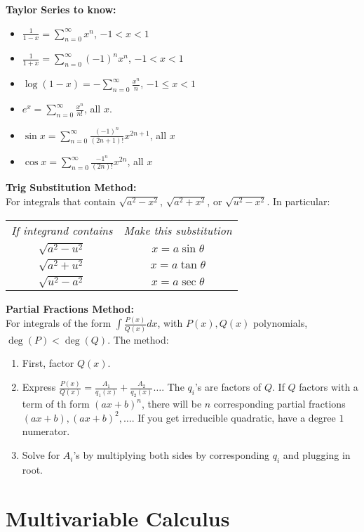 \documentclass[12pt]{amsart}
\begin{document}
\begin{multicols}{2}
\textbf{Taylor Series to know:}
\begin{itemize}
    \item $ \frac{1}{1-x} = \sum^{\infty}_{n=0} x^n$, $-1 < x < 1$
    \item $ \frac{1}{1+x} = \sum^{\infty}_{n=0} {(-1)}^n x^n$, $-1 < x < 1$
    \item $ \log(1-x) = -\sum^{\infty}_{n=0} \frac{x^n}{n}$, $-1 \leq x < 1$
    \item $ e^x = \sum^{\infty}_{n=0} \frac{x^n}{n!} $, all $x$.
    \item $ \sin x = \sum^{\infty}_{n=0} \frac{{(-1)}^n}{(2n+1)!}x^{2n+1}$, all $x$
    \item $ \cos x = \sum^{\infty}_{n=0} \frac{{-1}^n}{(2n)!}x^{2n}$, all $x$
\end{itemize}
\textbf{Trig Substitution Method:}\\
For integrals that contain $\sqrt{a^2-x^2}$, $\sqrt{a^2+x^2}$, or $\sqrt{u^2-x^2}$. In particular:
\begin{center}
    \begin{tabular}{c c}
        \textit{If integrand contains} & \textit{Make this substitution} \\
        $\sqrt{a^2-u^2}$               & $x = a\sin\theta$\\
        $\sqrt{a^2+u^2}$               & $x = a\tan\theta$\\
        $\sqrt{u^2-a^2}$               & $x = a\sec\theta$\\
    \end{tabular}
\end{center}
\textbf{Partial Fractions Method:}\\
For integrals of the form $\int \frac{P(x)}{Q(x)} dx$, with $P(x), Q(x)$ polynomials, $\deg(P) < \deg(Q)$. The method:
\begin{enumerate}
    \item First, factor $Q(x)$.
    \item Express $\frac{P(x)}{Q(x)} = \frac{A_1}{q_1(x)} + \frac{A_2}{q_2(x)} \dots$. The $q_i$'s are factors of $Q$. If $Q$ factors with a term of th form $(ax+b)^n$, there will be $n$ corresponding partial fractions $(ax+b), (ax+b)^2, \dots$. If you get irreducible quadratic, have a degree $1$ numerator.
    \item Solve for $A_i$'s by multiplying both sides by corresponding $q_i$ and plugging in root.
\end{enumerate}
\section{Multivariable Calculus}%
\label{sec:multivariable_calculus}


\end{multicols}
\end{document}
